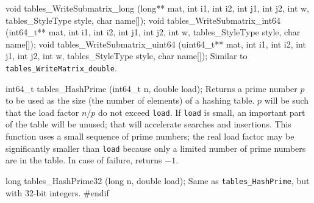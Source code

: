 void tables_WriteSubmatrix_long (long** mat, int i1, int i2, int j1, int j2, 
                                 int w, tables_StyleType style, char name[]);
void tables_WriteSubmatrix_int64 (int64_t** mat, int i1, int i2, int j1, int j2,
                                  int w, tables_StyleType style, char name[]);
void tables_WriteSubmatrix_uint64 (uint64_t** mat, int i1, int i2, int j1, int j2, 
                                   int w, tables_StyleType style, char name[]);
\endcode
 \tab Similar to {\tt tables\_WriteMatrix\_double}.
 \endtab
\code

int64_t tables_HashPrime (int64_t n, double load);
\endcode
  \tab Returns a prime number $p$ to be used as the size 
   (the number of elements) of a hashing table.
   $p$ will be such that the load factor $n/p$ do not exceed {\tt load}.
   If {\tt load} is small, an important part of the table will be unused; that
   will accelerate searches and insertions.
   This function uses a small sequence of prime numbers; the real load factor
   may be significantly smaller than {\tt load} because only a limited
   number of prime numbers are in the table. In case of failure, returns $-1$.
 \endtab
\code

long tables_HashPrime32 (long n, double load);
\endcode
  \tab Same as \texttt{tables\_HashPrime}, but with 32-bit integers.
 \endtab
\code\hide
#endif
\endhide
\endcode

